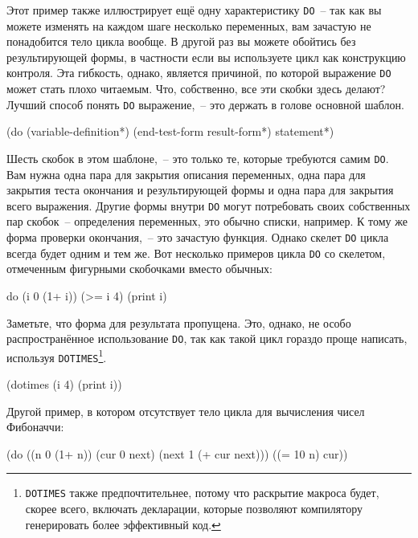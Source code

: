 Этот пример также иллюстрирует ещё одну характеристику \lstinline{DO}~-- так как вы можете
изменять на каждом шаге несколько переменных, вам зачастую не понадобится тело цикла
вообще. В другой раз вы можете обойтись без результирующей формы, в частности если вы
используете цикл как конструкцию контроля. Эта гибкость, однако, является причиной, по
которой выражение \lstinline{DO} может стать плохо читаемым. Что, собственно, все эти скобки
здесь делают? Лучший способ понять \lstinline{DO} выражение,~-- это держать в голове основной
шаблон.

\begin{myverb}
(do (variable-definition*)
    (end-test-form result-form*)
  statement*)
\end{myverb}

Шесть скобок в этом шаблоне,~-- это только те, которые требуются самим \lstinline{DO}. Вам нужна
одна пара для закрытия описания переменных, одна пара для закрытия теста окончания и
результирующей формы и одна пара для закрытия всего выражения. Другие формы внутри
\lstinline{DO} могут потребовать своих собственных пар скобок~-- определения переменных, это
обычно списки, например. К тому же форма проверки окончания,~-- это зачастую функция. Однако
скелет \lstinline{DO} цикла всегда будет одним и тем же. Вот несколько примеров цикла \lstinline{DO}
со скелетом, отмеченным фигурными скобочками вместо обычных:

\begin{myverb}
{do {(i 0 (1+ i))}
    {(>= i 4)}
  (print i)}
\end{myverb}

Заметьте, что форма для результата пропущена. Это, однако, не особо распространённое
использование \lstinline{DO}, так как такой цикл гораздо проще написать, используя
\lstinline{DOTIMES}\footnote{\lstinline{DOTIMES} также предпочтительнее, потому что раскрытие
  макроса будет, скорее всего, включать декларации, которые позволяют компилятору
  генерировать более эффективный код.}.

\begin{myverb}
(dotimes (i 4) (print i))
\end{myverb}

Другой пример, в котором отсутствует тело цикла для вычисления чисел Фибоначчи:

\begin{myverb}
(do ((n 0 (1+ n))
     (cur 0 next)
     (next 1 (+ cur next)))
    ((= 10 n) cur))
\end{myverb}

